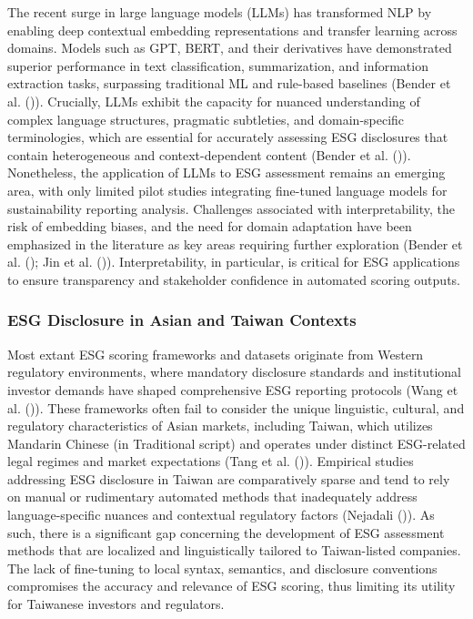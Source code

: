 \documentclass[
  12pt,
]{article}
\begin{document}
The recent surge in large language models (LLMs) has transformed NLP by
enabling deep contextual embedding representations and transfer learning
across domains. Models such as GPT, BERT, and their derivatives have
demonstrated superior performance in text classification, summarization,
and information extraction tasks, surpassing traditional ML and
rule-based baselines (Bender et al. ()).
Crucially, LLMs exhibit the capacity for nuanced understanding of
complex language structures, pragmatic subtleties, and domain-specific
terminologies, which are essential for accurately assessing ESG
disclosures that contain heterogeneous and context-dependent content
(Bender et al. ()). Nonetheless, the
application of LLMs to ESG assessment remains an emerging area, with
only limited pilot studies integrating fine-tuned language models for
sustainability reporting analysis. Challenges associated with
interpretability, the risk of embedding biases, and the need for domain
adaptation have been emphasized in the literature as key areas requiring
further exploration (Bender et al. ();
Jin et al. ()). Interpretability, in
particular, is critical for ESG applications to ensure transparency and
stakeholder confidence in automated scoring outputs.

\subsubsection{ESG Disclosure in Asian and Taiwan
Contexts}\label{esg-disclosure-in-asian-and-taiwan-contexts}

Most extant ESG scoring frameworks and datasets originate from Western
regulatory environments, where mandatory disclosure standards and
institutional investor demands have shaped comprehensive ESG reporting
protocols (Wang et al. ()). These
frameworks often fail to consider the unique linguistic, cultural, and
regulatory characteristics of Asian markets, including Taiwan, which
utilizes Mandarin Chinese (in Traditional script) and operates under
distinct ESG-related legal regimes and market expectations (Tang et al.
()). Empirical studies addressing ESG
disclosure in Taiwan are comparatively sparse and tend to rely on manual
or rudimentary automated methods that inadequately address
language-specific nuances and contextual regulatory factors (Nejadali
()). As such, there is a significant
gap concerning the development of ESG assessment methods that are
localized and linguistically tailored to Taiwan-listed companies. The
lack of fine-tuning to local syntax, semantics, and disclosure
conventions compromises the accuracy and relevance of ESG scoring, thus
limiting its utility for Taiwanese investors and regulators.
\end{document}
